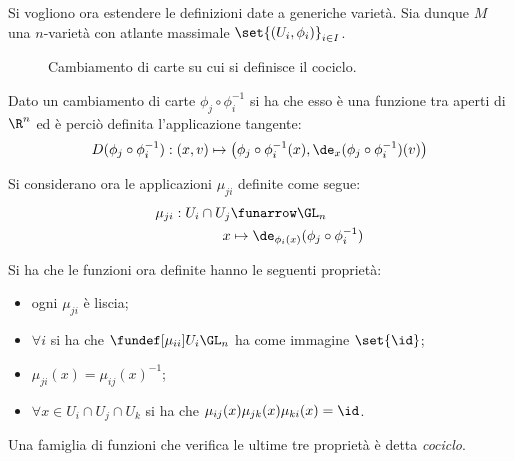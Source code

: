 
Si vogliono ora estendere le definizioni date a generiche varietà.
Sia dunque $M$ una $n$-varietà con atlante massimale $\set{(U_i, \phi _i)}_{i\in I}$.

\begin{figure}
\centering

\caption{Cambiamento di carte su cui si definisce il cociclo.}
\end{figure}

\begin{oss}
Dato un cambiamento di carte $\phi _j \circ \phi _i ^{-1}$ si ha che esso è una funzione tra aperti di $\R ^n$ ed è perciò definita l'applicazione tangente:
\begin{equation*}
D(\phi _j \circ \phi _i ^{-1}): (x,v) \mapsto \big(\phi _j \circ \phi _i ^{-1}(x), \de_x(\phi _j \circ \phi _i ^{-1})(v)\big)
\end{equation*}
\end{oss}

Si considerano ora le applicazioni $\mu_{ji}$ definite come segue:
\begin{align*}
\mu_{ji} : U_i\cap U_j &\funarrow \GL_n \\
x &\mapsto \de_{\phi_i(x)} (\phi _j \circ \phi _i ^{-1})
\end{align*}

\begin{oss}
Si ha che le funzioni ora definite hanno le seguenti proprietà:
\begin{itemize}
\item ogni $\mu_{ji}$ è liscia;
\item $\forall i$ si ha che $\fundef[\mu_{ii}]{U_i}{\GL_n}$ ha come immagine $\set{\id}$;
\item $\mu_{ji}(x) = \mu_{ij}(x)^{-1}$;
\item $\forall x \in U_i\cap U_j\cap U_k$ si ha che $\mu_{ij}(x)\mu_{jk}(x)\mu_{ki}(x) = \id$.
\end{itemize}
Una famiglia di funzioni che verifica le ultime tre proprietà è detta \emph{cociclo}.
\end{oss}


\begin{epigraphs}	
\end{epigraphs}
